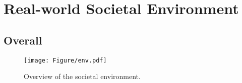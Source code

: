 \section{Real-world Societal Environment}\label{sec:environment}

\subsection{Overall}

\begin{figure}[ht]
\centering
\texttt{[image: Figure/env.pdf]}
\caption{Overview of the societal environment.}
\label{fig:env}
\end{figure}


